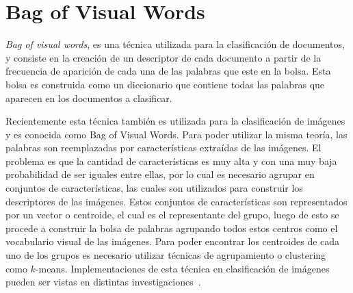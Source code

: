 
\section{Bag of Visual Words}
\label{sec:bag_of_words}
\textit{Bag of visual words}, es una técnica utilizada para la clasificación de documentos, y consiste en la creación de un descriptor de cada documento a partir de la frecuencia de aparición de cada una de las palabras que este en la bolsa. Esta bolsa es construida como un diccionario que contiene todas las palabras que aparecen en los documentos a clasificar.

Recientemente esta técnica también es utilizada para la clasificación de imágenes y es conocida como Bag of Visual Words. Para poder utilizar la misma teoría, las palabras son reemplazadas por características extraídas de las imágenes. El problema es que la cantidad de características es muy alta y con una muy baja probabilidad de ser iguales entre ellas, por lo cual es necesario agrupar en conjuntos de características, las cuales son utilizados para construir los descriptores de las imágenes. Estos conjuntos de características son representados por un vector o centroide, el cual es el representante del grupo, luego de esto se procede a construir la bolsa de palabras agrupando todos estos centros como el vocabulario visual de las imágenes. Para poder encontrar los centroides de cada uno de los grupos es necesario utilizar técnicas de agrupamiento o clustering como $k$-means. Implementaciones de esta técnica en clasificación de imágenes pueden ser vistas en distintas investigaciones~\cite{Csurka2004,Dollar2005,Sivic2009}.

